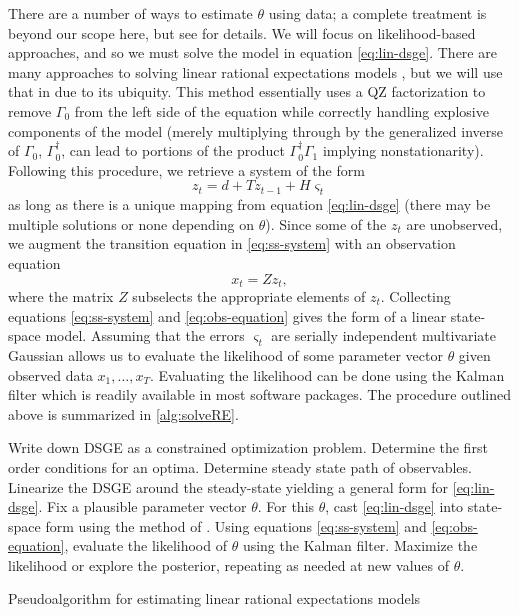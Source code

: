 \documentclass[11pt]{article}
\begin{document}
There are a number of ways to estimate \(\theta\) using data; a complete
treatment is beyond our scope here, but see \citet{DeJongDave2007} for
details. We will focus on likelihood-based approaches, and so we must
solve the model in equation \eqref{eq:lin-dsge}. There are many
approaches to solving linear rational expectations models
\citep[e.g.][]{BlanchardKahn1980,Klein2000}, but we will use that in
\citet{Sims2002} due to its ubiquity. This method essentially uses a QZ
factorization to remove \(\Gamma_0\) from the left side of the equation
while correctly handling explosive components of the model (merely
multiplying through by the generalized inverse of \(\Gamma_0\),
\(\Gamma_0^\dagger\), can lead to portions of the product
\(\Gamma_0^\dagger \Gamma_1\) implying nonstationarity). Following this
procedure, we retrieve a system of the form \begin{equation}
  \label{eq:ss-system}
  z_t = d + T z_{t-1} + H \varsigma_t
\end{equation} as long as there is a unique mapping from equation
\eqref{eq:lin-dsge} (there may be multiple solutions or none depending
on \(\theta\)). Since some of the \(z_t\) are unobserved, we augment the
transition equation in \eqref{eq:ss-system} with an observation equation
\begin{equation}
  \label{eq:obs-equation}
  x_t = Z z_t,
\end{equation} where the matrix \(Z\) subselects the appropriate
elements of \(z_t\). Collecting equations \eqref{eq:ss-system} and
\eqref{eq:obs-equation} gives the form of a linear state-space model.
Assuming that the errors \(\varsigma_t\) are serially independent
multivariate Gaussian allows us to evaluate the likelihood of some
parameter vector \(\theta\) given observed data \(x_1,\ldots,x_T\).
Evaluating the likelihood can be done using the Kalman filter
\citep{Kalman1960} which is readily available in most software packages.
The procedure outlined above is summarized in \autoref{alg:solveRE}.

\begin{algorithm}[t]
\begin{algorithmic}[1]
  \State Write down DSGE as a constrained optimization problem.
  \State Determine the first order conditions for an optima.
  \State Determine steady state path of observables.
  \State Linearize the DSGE around the steady-state yielding a general
    form for \eqref{eq:lin-dsge}.
    \State Fix a plausible parameter vector $\theta$.
    \State For this $\theta$, cast \eqref{eq:lin-dsge} into state-space form
      using the method of \citet{Sims2002}.
    \State Using equations \eqref{eq:ss-system} and \eqref{eq:obs-equation}, evaluate the
      likelihood of $\theta$ using the Kalman filter.
    \State Maximize the likelihood or explore the posterior, repeating
      as needed at new values of $\theta$.
    \EndProcedure
  \end{algorithmic}
  \caption{Pseudoalgorithm for estimating linear rational expectations models}
  \label{alg:solveRE}
\end{algorithm}
\end{document}
